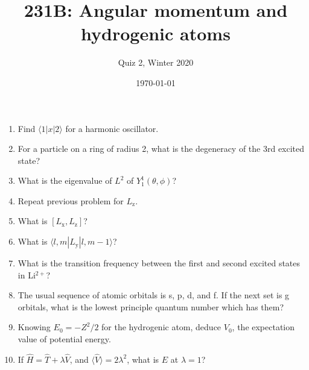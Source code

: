




\title{231B: Angular momentum and hydrogenic atoms}
\author{Quiz 2, Winter 2020}
\date{\today}
\maketitle

\begin{enumerate}

\item Find $\langle 1 | x | 2 \rangle$ for a harmonic oscillator.

\item For a particle on a ring of radius 2, what is the degeneracy of
the 3rd excited state?

\item What is the eigenvalue of $L^2$ of $Y_1^1(\theta,\phi)$?

\item Repeat previous problem for $L_{\text{z}}$.

\item What is $[L_{\text{x}},L_{\text{z}}]$?

\item What is $\langle l,m| L_{\text{y}} | l,m-1 \rangle$?

\item What is the transition frequency between the first and second
excited states in Li$^{2+}$?

\item The usual sequence of atomic orbitals is s, p, d, and f. If
the next set is g orbitals, what is the lowest principle quantum
number which has them?

\item Knowing $E_0 = -Z^2/2$ for the hydrogenic atom,
deduce $V_0$, the expectation value of potential energy.

\item If $\hat{H} = \hat{T} + \lambda \hat{V}$, and
$\langle \hat{V}\rangle = 2\lambda^2$, what is $E$ at $\lambda=1$?

\end{enumerate}

